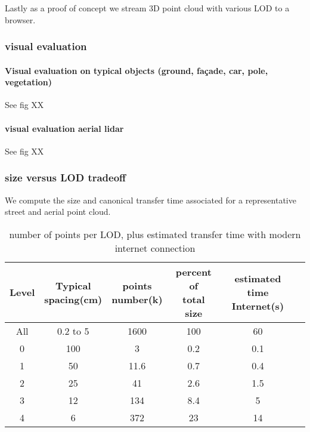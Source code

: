 			Lastly as a proof of concept we stream 3D point cloud with various LOD to a browser.
		
		\subsubsection{visual evaluation}
			\paragraph{Visual evaluation on typical objects (ground, façade, car, pole, vegetation)}
				See fig XX 
			
			\paragraph{visual evaluation aerial lidar}			
				See fig XX 
		
		\subsubsection{size versus LOD tradeoff}
			We compute the size and canonical transfer time associated for a representative street and aerial point cloud.
			 	 
			 \begin{table}[ht]
				\centering
				\caption{ number of points per LOD, plus estimated transfer time with modern internet connection}
				\scriptsize 
				\begin{tabular}{|c|c|c|c|c|c}
				\hline Level & \shortstack{Typical \\ spacing(cm)} & \shortstack{ points \\ number(k)} & \shortstack{percent of \\ total size} & \shortstack{estimated \\ time Internet(s)}   \\
				\hline All & 0.2 to 5  & 1600 & 100 & 60 \\ 
				\hline 0 & 100 & 3 & 0.2 & 0.1 \\ 
				\hline 1 & 50 & 11.6 & 0.7 & 0.4 \\ 
				\hline 2 & 25 & 41 & 2.6 & 1.5 \\ 
				\hline 3 & 12 & 134 & 8.4 & 5 \\ 
				\hline 4 & 6 & 372 & 23 & 14 \\  
				
				\hline 
				\end{tabular} 
			\end{table}
			 
